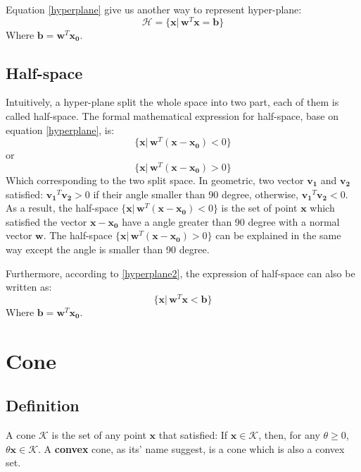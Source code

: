 \documentclass[10pt,a4paper]{article}
\begin{document}
Equation \ref{hyperplane} give us another way to represent hyper-plane:
\begin{equation}
	\mathcal{H} = \{ \mathbf{x} |\, \mathbf{w}^{T} \mathbf{x} = \mathbf{b} \}
	\label{hyperplane2}
\end{equation}
Where $\mathbf{b} = \mathbf{w}^{T} \mathbf{x_{0}}$.

\subsection{Half-space}
Intuitively, a hyper-plane split the whole space into two part, each of them is called half-space. The formal mathematical expression for half-space, base on equation \ref{hyperplane}, is:
\begin{equation*}
	\{ \mathbf{x} |\, \mathbf{w}^{T}(\mathbf{x} - \mathbf{x_{0}}) < 0 \}
\end{equation*}
or
\begin{equation*}
	\{ \mathbf{x} |\, \mathbf{w}^{T}(\mathbf{x} - \mathbf{x_{0}}) > 0 \}
\end{equation*}
Which corresponding to the two split space. In geometric, two vector $\mathbf{v_{1}}$ and $\mathbf{v_{2}}$ satisfied: $\mathbf{v_{1}}^{T} \mathbf{v_{2}} > 0$ if their angle smaller than 90 degree, otherwise, $\mathbf{v_{1}}^{T} \mathbf{v_{2}} < 0$. As a result, the half-space $\{ \mathbf{x} |\, \mathbf{w}^{T}(\mathbf{x} - \mathbf{x_{0}}) < 0 \}$ is the set of point $\mathbf{x}$ which satisfied the vector $\mathbf{x} - \mathbf{x_{0}}$ have a angle greater than 90 degree with a normal vector $\mathbf{w}$. The half-space $\{ \mathbf{x} |\, \mathbf{w}^{T} (\mathbf{x} - \mathbf{x_{0}}) > 0 \}$ can be explained in the same way except the angle is smaller than 90 degree.

Furthermore, according to \ref{hyperplane2}, the expression of half-space can also be written as:
\begin{equation*}
	\{ \mathbf{x} |\, \mathbf{w}^{T} \mathbf{x} < \mathbf{b} \}
\end{equation*}
Where $\mathbf{b} = \mathbf{w}^{T} \mathbf{x_{0}}$.

\section{Cone}
\subsection{Definition}
A cone $\mathcal{K}$ is the set of any point $\mathbf{x}$ that satisfied: If $\mathbf{x} \in \mathcal{K}$, then, for any $\theta \geq 0$, $\theta \mathbf{x} \in \mathcal{K}$. A \textbf{convex} cone, as its' name suggest, is a cone which is also a convex set.
\end{document}

